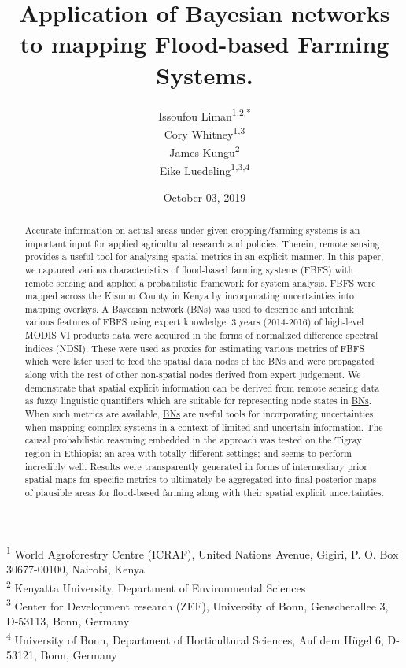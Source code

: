 \documentclass[12pt,oneside]{article}
\title{Application of Bayesian networks to mapping Flood-based Farming Systems.}
\author{Issoufou Liman\textsuperscript{1,2,*} \\ Cory Whitney\textsuperscript{1,3} \\ James Kungu\textsuperscript{2} \\ Eike Luedeling\textsuperscript{1,3,4}}
\date{October 03, 2019}
\begin{document}
\maketitle
\begin{abstract}
Accurate information on actual areas under given cropping/farming systems is an important input for applied agricultural research and policies. Therein, remote sensing provides a useful tool for analysing spatial metrics in an explicit manner. In this paper, we captured various characteristics of flood-based farming systems (FBFS) with remote sensing and applied a probabilistic framework for system analysis. FBFS were mapped across the Kisumu County in Kenya by incorporating uncertainties into mapping overlays. A Bayesian network (\href{https://en.wikipedia.org/wiki/Bayesian_network}{BNs}) was used to describe and interlink various features of FBFS using expert knowledge. 3 years (2014-2016) of high-level \href{https://terra.nasa.gov/about/terra-instruments/modis}{MODIS} VI products data were acquired in the forms of normalized difference spectral indices (NDSI). These were used as proxies for estimating various metrics of FBFS which were later used to feed the spatial data nodes of the \href{https://en.wikipedia.org/wiki/Bayesian_network}{BNs} and were propagated along with the rest of other non-spatial nodes derived from expert judgement. We demonstrate that spatial explicit information can be derived from remote sensing data as fuzzy linguistic quantifiers which are suitable for representing node states in \href{https://en.wikipedia.org/wiki/Bayesian_network}{BNs}. When such metrics are available, \href{https://en.wikipedia.org/wiki/Bayesian_network}{BNs} are useful tools for incorporating uncertainties when mapping complex systems in a context of limited and uncertain information. The causal probabilistic reasoning embedded in the approach was tested on the Tigray region in Ethiopia; an area with totally different settings; and seems to perform incredibly well. Results were transparently generated in forms of intermediary prior spatial maps for specific metrics to ultimately be aggregated into final posterior maps of plausible areas for flood-based farming along with their spatial explicit uncertainties.
\end{abstract}

{
\hypersetup{linkcolor=black}
\setcounter{tocdepth}{5}
\tableofcontents
}
\textsuperscript{1} World Agroforestry Centre (ICRAF), United Nations Avenue, Gigiri, P. O. Box 30677-00100, Nairobi, Kenya\\
\textsuperscript{2} Kenyatta University, Department of Environmental Sciences\\
\textsuperscript{3} Center for Development research (ZEF), University of Bonn, Genscherallee 3, D-53113, Bonn, Germany\\
\textsuperscript{4} University of Bonn, Department of Horticultural Sciences, Auf dem Hügel 6, D-53121, Bonn, Germany
\end{document}
